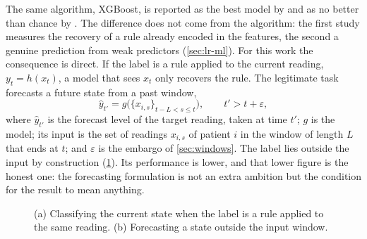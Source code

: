 \documentclass[11pt,a4paper,oneside]{report}
\begin{document}
The same algorithm, XGBoost, is reported as the best model by \textcite{efendi2025} and as no better than chance by \textcite{mendoza2025}. The difference does not come from the algorithm: the first study measures the recovery of a rule already encoded in the features, the second a genuine prediction from weak predictors (\cref{sec:lr-ml}). For this work the consequence is direct. If the label is a rule applied to the current reading, $y_t = h(x_t)$, a model that sees $x_t$ only recovers the rule. The legitimate task forecasts a future state from a past window,
\begin{equation}
  \hat{y}_{t'} = g\bigl(\{x_{i,s}\}_{t-L < s \leq t}\bigr), \qquad t' > t + \varepsilon,
\end{equation}
where $\hat{y}_{t'}$ is the forecast level of the target reading, taken at time $t'$; $g$ is the model; its input is the set of readings $x_{i,s}$ of patient $i$ in the window of length $L$ that ends at $t$; and $\varepsilon$ is the embargo of \cref{sec:windows}. The label lies outside the input by construction (\cref{fig:leak-vs-forecast}). Its performance is lower, and that lower figure is the honest one: the forecasting formulation is not an extra ambition but the condition for the result to mean anything.

\begin{figure}[htbp]
\centering
{}
\caption{(a) Classifying the current state when the label is a rule applied to the same reading. (b) Forecasting a state outside the input window.}\label{fig:leak-vs-forecast}
\end{figure}
\end{document}

